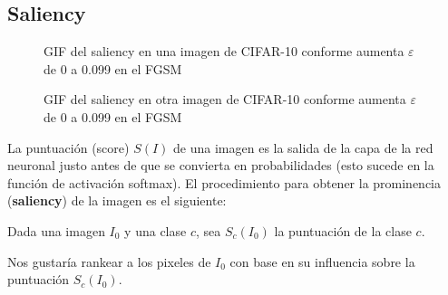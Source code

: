 \pagebreak
    
\subsection{Saliency}

\begin{figure}[h!]
    \caption{GIF del saliency en una imagen de CIFAR-10 conforme aumenta $\varepsilon$ de 0 a 0.099 en el FGSM}
    \label{cat_sal}
\end{figure}
\begin{figure}[h!]
    \caption{GIF del saliency en otra imagen de CIFAR-10 conforme aumenta $\varepsilon$ de 0 a 0.099 en el FGSM}
    \label{frog_sal}
\end{figure}

La puntuación (score) $S(I)$ de una imagen es la salida de la capa de la red neuronal justo antes de que se convierta en probabilidades (esto sucede en la función de activación softmax). El procedimiento para obtener la prominencia (\textbf{saliency}) de la imagen es el siguiente:

\noindent
Dada una imagen $I_0$ y una clase $c$, sea $S_c(I_0)$ la puntuación de la clase $c$. 

\noindent
Nos gustaría rankear a los pixeles de $I_0$ con base en su influencia sobre la puntuación $S_c(I_0)$.

